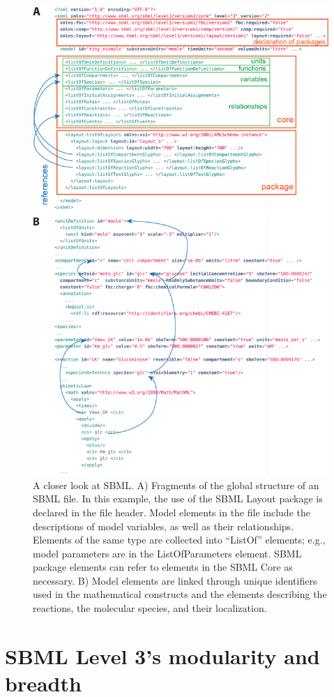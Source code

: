 \documentclass[]{draft-sbml-paper}
\begin{document}
\begin{figure}[htb]
   \center
   \includegraphics[width=.8\textwidth]{res/SBML_XML_example_v03.png}
 \caption{A closer look at SBML. A) Fragments of the global structure of an SBML file. In this example, the use of the SBML Layout package is declared in the file header. Model elements in the file include the descriptions of model variables, as well as their relationships.  Elements of the same type are collected into ``ListOf'' elements; e.g., model parameters are in the ListOfParameters element. SBML package elements can refer to elements in the SBML Core as necessary. B) Model elements are linked through unique identifiers used in the mathematical constructs and the elements describing the reactions, the molecular species, and their localization.}
\label{fig:examples-sbml}
\end{figure}


\clearpage
\newpage

\section*{SBML Level 3's modularity and breadth}\label{sec:modularity}
\end{document}

